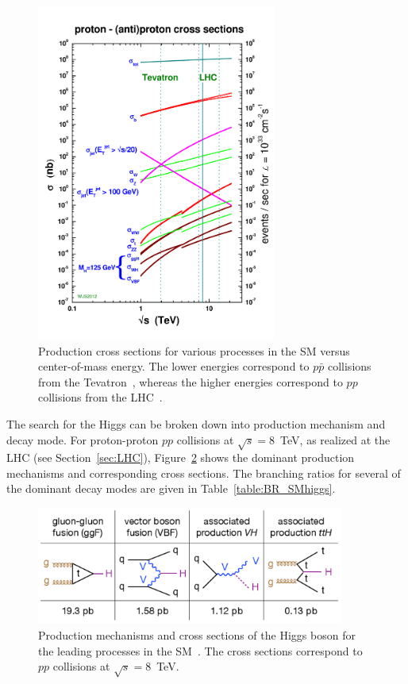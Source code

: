 \begin{figure}[ht]
 \begin{center}
    \includegraphics[width=0.70\textwidth]{figures/intro/crosssections2012_v5.pdf}
      \end{center}
\caption{Production cross sections for various processes in the SM versus center-of-mass energy.
The lower energies correspond to $p\bar{p}$ collisions from the Tevatron~\cite{Group:1984bk}, whereas
the higher energies correspond to $pp$ collisions from the LHC~\cite{cern-jinst-lhc}.}
\label{fig:crosssections}
\end{figure}

The search for the Higgs can be broken down into production mechanism and decay mode. For
proton-proton $pp$
collisions at $\sqrt{s} = 8$~TeV, as realized at the LHC (see Section~\ref{sec:LHC}),
Figure~\ref{fig:higgsprod} shows the
dominant production mechanisms and corresponding cross sections. The branching ratios for several
of the dominant decay modes are given in Table~\ref{table:BR_SMhiggs}.

\begin{figure}[ht]
 \begin{center}
    \includegraphics[width=0.90\textwidth]{figures/intro/higgsproductions.pdf}
      \end{center}
\caption{Production mechanisms and cross sections of the Higgs boson
for the leading processes in the SM~\cite{Tuna:thesis}. The cross sections correspond to
$pp$ collisions at $\sqrt{s} = 8$~TeV.}
\label{fig:higgsprod}
\end{figure}

